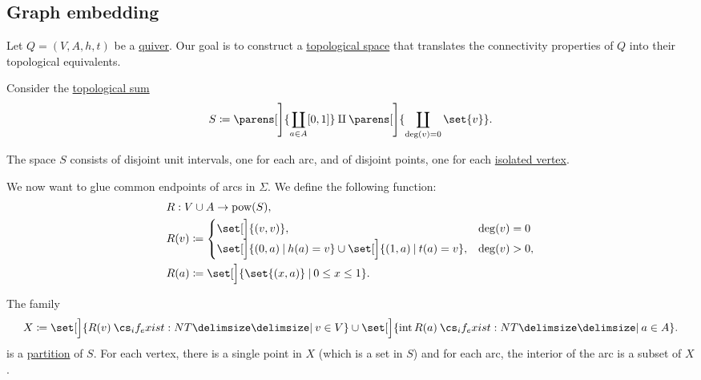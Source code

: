 \subsection{Graph embedding}\label{subsec:graph_embedding}

\begin{definition}\label{def:quiver_geometric_realization}
  Let \( Q = (V, A, h, t) \) be a \hyperref[def:quiver]{quiver}. Our goal is to construct a \hyperref[def:topological_space]{topological space} that translates the connectivity properties of \( Q \) into their topological equivalents.

  Consider the \hyperref[def:topological_sum]{topological sum}
  \begin{equation*}
    S \coloneqq \parens[\Bigg]{ \coprod_{a \in A} [0, 1] } \amalg \parens[\Bigg]{ \coprod_{\deg(v) = 0} \set{ v } }.
  \end{equation*}

  The space \( S \) consists of disjoint unit intervals, one for each arc, and of disjoint points, one for each \hyperref[def:hypergraph/degree]{isolated vertex}.

  We now want to glue common endpoints of arcs in \( \Sigma \). We define the following function:
  \begin{equation}\label{eq:def:quiver_geometric_realization}
    \begin{aligned}
      &R: V \cup A \to \pow(S), \\
      &R(v) \coloneqq \begin{cases}
        \set[\Big]{ (v, v) },                                                           &\deg(v) = 0 \\
        \set[\Big]{ (0, a) \given h(a) = v } \cup \set[\Big]{ (1, a) \given t(a) = v }, &\deg(v) > 0,
      \end{cases} \\
      &R(a) \coloneqq \set[\Big]{ \set{ (x, a) } \given 0 \leq x \leq 1 }.
    \end{aligned}
  \end{equation}

  The family
  \begin{equation*}
    X \coloneqq \set[\Big]{ R(v) \given* v \in V } \cup \set[\Big]{ \Int R(a) \given* a \in A }.
  \end{equation*}
  is a \hyperref[def:set_partition]{partition} of \( S \). For each vertex, there is a single point in \( X \) (which is a set in \( S \)) and for each arc, the interior of the arc is a subset of \( X \).


\end{definition}
